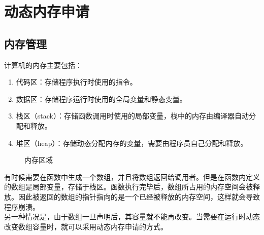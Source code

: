 \newpage

\section{动态内存申请}

\subsection{内存管理}

计算机的内存主要包括：

\begin{enumerate}
    \item 代码区：存储程序执行时使用的指令。
    \item 数据区：存储程序运行时使用的全局变量和静态变量。
    \item 栈区（stack）：存储函数调用时使用的局部变量，栈中的内存由编译器自动分配和释放。
    \item 堆区（heap）：存储动态分配内存的变量，需要由程序员自己分配和释放。
\end{enumerate}

\begin{figure}[H]
    \centering
    \caption{内存区域}
\end{figure}

有时候需要在函数中生成一个数组，并且将数组返回给调用者。但是在函数内定义的数组是局部变量，存储于栈区。函数执行完毕后，数组所占用的内存空间会被释放。因此被返回的数组的指针指向的是一个已经被释放的内存空间，这样就会导致程序崩溃。\\

另一种情况是，由于数组一旦声明后，其容量就不能再改变。当需要在运行时动态改变数组容量时，就可以采用动态内存申请的方式。\\

